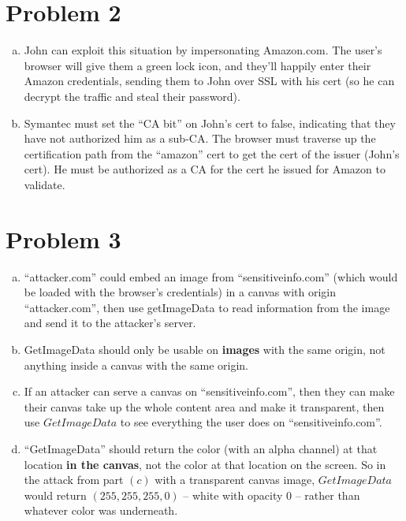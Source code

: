 \documentclass{article}
\begin{document}
\section*{Problem 2}
\begin{enumerate}[(a)]
\item John can exploit this situation by impersonating Amazon.com. The user's browser will give them a green lock icon, and they'll happily enter their Amazon credentials, sending them to John over SSL with his cert (so he can decrypt the traffic and steal their password).
\item Symantec must set the ``CA bit'' on John's cert to false, indicating that they have not authorized him as a sub-CA. The browser must traverse up the certification path from the ``amazon'' cert to get the cert of the issuer (John's cert). He must be authorized as a CA for the cert he issued for Amazon to validate.
\end{enumerate}


\section*{Problem 3}
\begin{enumerate}[(a)]
\item ``attacker.com'' could embed an image from ``sensitiveinfo.com'' (which would be loaded with the browser's credentials) in a canvas with origin ``attacker.com'', then use getImageData to read information from the image and send it to the attacker's server.
\item GetImageData should only be usable on \textbf{images} with the same origin, not anything inside a canvas with the same origin.
\item If an attacker can serve a canvas on ``sensitiveinfo.com'', then they can make their canvas take up the whole content area and make it transparent, then use $GetImageData$ to see everything the user does on ``sensitiveinfo.com''.
\item ``GetImageData'' should return the color (with an alpha channel) at that location \textbf{in the canvas}, not the color at that location on the screen. So in the attack from part $(c)$ with a transparent canvas image, $GetImageData$ would return $(255, 255, 255, 0)$ -- white with opacity 0 -- rather than whatever color was underneath.
\end{enumerate}
\end{document}
